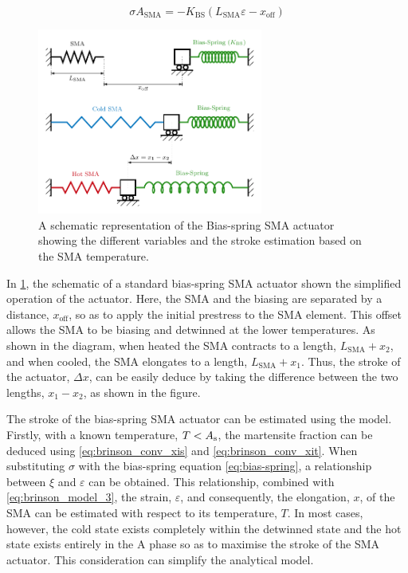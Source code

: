 \begin{equation}
    \label{eq:bias-spring}
    \sigma A_\mathrm{SMA} = -K_\mathrm{BS}\left(L_\mathrm{SMA}\varepsilon-x_\mathrm{off}\right)
\end{equation}
\begin{figure}[hbt]
    \centering
    \includegraphics[width=0.66\textwidth]{images/chap2/bias-spring-diagram.pdf}
    \caption{A schematic representation of the Bias-spring SMA actuator showing the different variables and the stroke estimation based on the SMA temperature.}
    \label{fig:bias-spring-diagram}
\end{figure}

In \cref{fig:bias-spring-diagram}, the schematic of a standard bias-spring SMA actuator shown the simplified operation of the actuator. Here, the SMA and the biasing are separated by a distance, $x_\mathrm{off}$, so as to apply the initial prestress to the SMA element. This offset allows the SMA to be biasing and detwinned at the lower temperatures. As shown in the diagram, when heated the SMA contracts to a length, $L_\mathrm{SMA}+x_2$, and when cooled, the SMA elongates to a length, $L_\mathrm{SMA}+x_1$. Thus, the stroke of the actuator, $\Delta x$, can be easily deduce by taking the difference between the two lengths, $x_1-x_2$, as shown in the figure.

The stroke of the bias-spring SMA actuator can be estimated using the \cite{brinsonOneDimensionalConstitutiveBehavior1993} model. Firstly, with a known temperature, $T < A_\mathrm{s}$, the martensite fraction can be deduced using \cref{eq:brinson_conv_xis} and \cref{eq:brinson_conv_xit}. When substituting $\sigma$ with the bias-spring equation \ref{eq:bias-spring}, a relationship between $\xi$ and $\varepsilon$ can be obtained. This relationship, combined with \cref{eq:brinson_model_3}, the strain, $\varepsilon$, and consequently, the elongation, $x$, of the SMA can be estimated with respect to its temperature, $T$. In most cases, however, the cold state exists completely within the detwinned state and the hot state exists entirely in the A phase so as to maximise the stroke of the SMA actuator. This consideration can simplify the analytical model.


